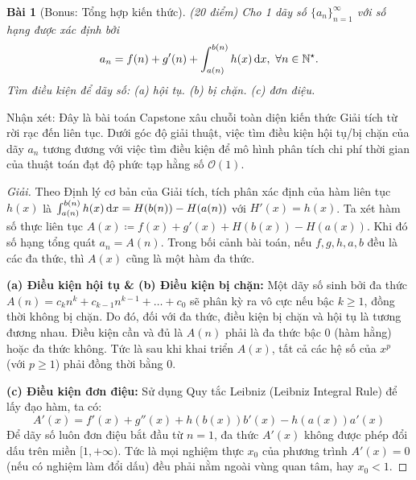 \documentclass{article}
\newtheorem{baitoan}{Bài}
\begin{document}
\begin{baitoan}[Bonus: Tổng hợp kiến thức]
	{\rm(20 điểm)} Cho 1 dãy số $\{a_n\}_{n=1}^\infty$ với số hạng được xác định bởi
	\begin{equation*}
		a_n = f(n) + g'(n) + \int_{a(n)}^{b(n)} h(x)\,{\rm d}x,\ \forall n\in\mathbb{N}^\star.
	\end{equation*}
	Tìm điều kiện để dãy số: (a) hội tụ. (b) bị chặn. (c) đơn điệu.
\end{baitoan}

\textsf{Nhận xét}: Đây là bài toán Capstone xâu chuỗi toàn diện kiến thức Giải tích từ rời rạc đến liên tục. Dưới góc độ giải thuật, việc tìm điều kiện hội tụ/bị chặn của dãy $a_n$ tương đương với việc tìm điều kiện để mô hình phân tích chi phí thời gian của thuật toán đạt độ phức tạp hằng số $\mathcal{O}(1)$.

\begin{proof}[Giải]
	Theo Định lý cơ bản của Giải tích, tích phân xác định của hàm liên tục $h(x)$ là $\int_{a(n)}^{b(n)} h(x)\,{\rm d}x = H(b(n)) - H(a(n))$ với $H'(x) = h(x)$.
	Ta xét hàm số thực liên tục $A(x) \coloneqq f(x) + g'(x) + H(b(x)) - H(a(x))$. Khi đó số hạng tổng quát $a_n = A(n)$. 
	Trong bối cảnh bài toán, nếu $f, g, h, a, b$ đều là các đa thức, thì $A(x)$ cũng là một hàm đa thức.
	
	\textbf{(a) Điều kiện hội tụ \& (b) Điều kiện bị chặn:}
	Một dãy số sinh bởi đa thức $A(n) = c_k n^k + c_{k-1}n^{k-1} + \dots + c_0$ sẽ phân kỳ ra vô cực nếu bậc $k \ge 1$, đồng thời không bị chặn.
	Do đó, đối với đa thức, điều kiện bị chặn và hội tụ là tương đương nhau. Điều kiện cần và đủ là $A(n)$ phải là đa thức bậc 0 (hàm hằng) hoặc đa thức không. Tức là sau khi khai triển $A(x)$, tất cả các hệ số của $x^p$ (với $p \ge 1$) phải đồng thời bằng 0.
	
	\textbf{(c) Điều kiện đơn điệu:}
	Sử dụng Quy tắc Leibniz (Leibniz Integral Rule) để lấy đạo hàm, ta có:
	$$ A'(x) = f'(x) + g''(x) + h(b(x))b'(x) - h(a(x))a'(x) $$
	Để dãy số luôn đơn điệu bắt đầu từ $n=1$, đa thức $A'(x)$ không được phép đổi dấu trên miền $[1, +\infty)$. Tức là mọi nghiệm thực $x_0$ của phương trình $A'(x) = 0$ (nếu có nghiệm làm đổi dấu) đều phải nằm ngoài vùng quan tâm, hay $x_0 < 1$.
\end{proof}


\printbibliography[heading=bibintoc]
	
\end{document}
